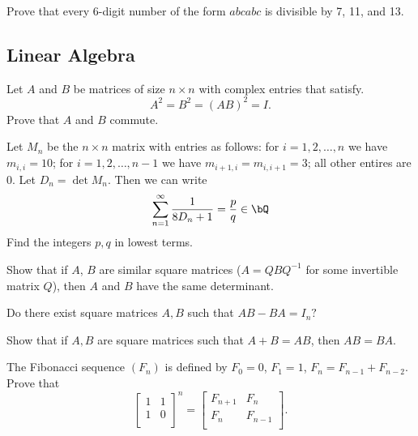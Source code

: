 \documentclass[12pt]{article}
\begin{document}
        \begin{exercise}
            Prove that every 6-digit number of the form \(abcabc\) is divisible by 7, 11, and 13.
        \end{exercise}

    \subsection{Linear Algebra}

        \begin{exercise}
            Let \(A\) and  \(B\) be matrices of size \(n\times n\) with complex entries that satisfy.
            \[A^2 = B^2 = (AB)^2 = I.\]
            Prove that \(A\) and \(B\) commute.
        \end{exercise}

        \begin{exercise}
            Let \(M_n\) be the \(n\times n\) matrix with entries as follows: for \(i=1,2,\ldots,n\) we have \(m_{i,i}=10\); for \(i=1,2,\ldots,n-1\) we have \(m_{i+1,i}=m_{i,i+1}=3\); all other entires are 0.
            Let \(D_n=\det M_n\).
            Then we can write
            \[\sum_{n=1}^\infty \frac{1}{8D_n+1} = \frac{p}{q}\in\bQ\]
            Find the integers \(p,q\) in lowest terms.
        \end{exercise}

        \begin{exercise}
            Show that if $A$, $B$ are similar square matrices ($A = QBQ^{-1}$ for some invertible matrix $Q$), then $A$ and $B$ have the same determinant.   
        \end{exercise}

        \begin{exercise}
            Do there exist square matrices $A, B$ such that $AB - BA = I_{n}?$  
        \end{exercise}
        
        \begin{exercise}
            Show that if $A, B$ are square matrices such that $A + B = AB$, then $AB = BA$. 
        \end{exercise}
        
        \begin{exercise}
        The Fibonacci sequence $(F_{n})$ is defined by $F_{0} = 0$, $F_{1} = 1$, $F_{n} = F_{n - 1} + F_{n - 2}$. Prove that 
        \[\begin{bmatrix}
            1&1\\
            1&0\\
        \end{bmatrix}^{n} = \begin{bmatrix}
            F_{n + 1}&F_{n}\\
            F_{n}&F_{n - 1}\\
            \end{bmatrix}.
        \]
        \end{exercise}
        
\end{document}

